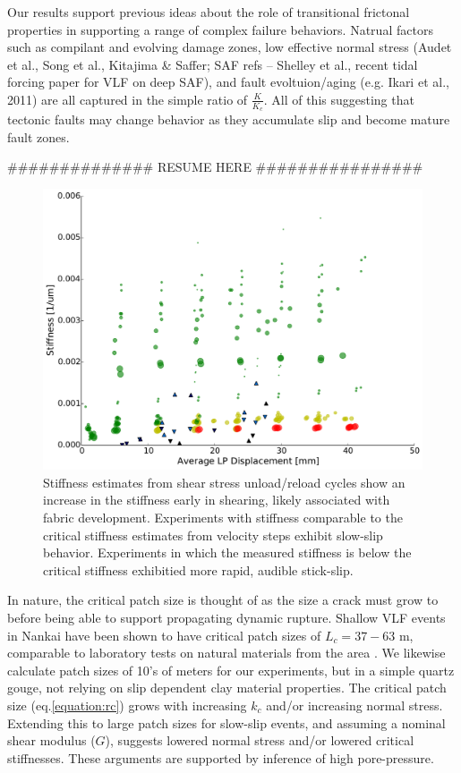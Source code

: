 \documentclass[11pt]{article}
\begin{document}
Our results support previous ideas about the role of transitional frictonal
properties in supporting a range of complex failure behaviors. Natrual factors
such as compilant and evolving damage zones, low effective normal stress (Audet
et al., Song et al., Kitajima & Saffer; SAF refs – Shelley et al., recent tidal
forcing paper for VLF on deep SAF), and fault evoltuion/aging (e.g. Ikari et
al., 2011) are all captured in the simple ratio of $\frac{K}{K_c}$.  All of this
suggesting that tectonic faults may change behavior as they accumulate slip and
become mature fault zones.

############## RESUME HERE ################

\begin{figure}
    \centering
        \includegraphics[scale=0.4]{../Figures/Fig_Stiffness_Evolution/Stiffness_Evolution.pdf}
       \caption{Stiffness estimates from shear stress unload/reload cycles show
       an increase in the stiffness early in shearing, likely associated with
       fabric development. Experiments with stiffness comparable to the critical stiffness
       estimates from velocity steps exhibit slow-slip behavior. Experiments in
       which the measured stiffness is below the critical stiffness exhibitied
       more rapid, audible stick-slip.}
      \label{Figure:Stiffness Evolution}
\end{figure}

In nature, the critical patch size is thought of as the size a crack must grow
to before being able to support propagating dynamic rupture. Shallow VLF events in
Nankai have been shown to have critical patch sizes of $L_c = 37-63$ m,
comparable to laboratory tests on natural materials from the area
\cite{Ikari:2013}. We likewise calculate  patch sizes of 10's of meters for our
experiments, but in a simple quartz gouge,  not relying on slip dependent clay
material properties. The critical patch size (eq.\ref{equation:rc}) grows with
increasing $k_c$ and/or increasing normal stress. Extending this to large patch
sizes for slow-slip events, and assuming a nominal shear modulus ($G$), suggests
lowered normal stress and/or lowered critical stiffnesses. These arguments are
supported by inference of high pore-pressure.
\end{document}
